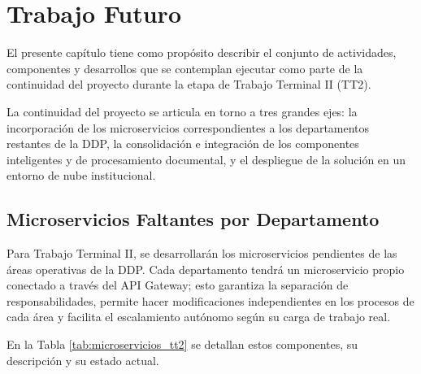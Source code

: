 
\chapter{Trabajo Futuro}
\label{cap:trabajo_futuro}
\justifying

El presente capítulo tiene como propósito describir el conjunto de actividades, componentes y desarrollos que se contemplan ejecutar como parte de la continuidad del proyecto durante la etapa de Trabajo Terminal II (TT2). 

La continuidad del proyecto se articula en torno a tres grandes ejes: la incorporación de los microservicios correspondientes a los departamentos restantes de la DDP, la consolidación e integración de los componentes inteligentes y de procesamiento documental, y el despliegue de la solución en un entorno de nube institucional.

\section{Microservicios Faltantes por Departamento}

Para Trabajo Terminal II, se desarrollarán los microservicios pendientes de las áreas operativas de la DDP. Cada departamento tendrá un microservicio propio conectado a través del API Gateway; esto garantiza la separación de responsabilidades, permite hacer modificaciones independientes en los procesos de cada área y facilita el escalamiento autónomo según su carga de trabajo real. 

En la Tabla \ref{tab:microservicios_tt2} se detallan estos componentes, su descripción y su estado actual.

